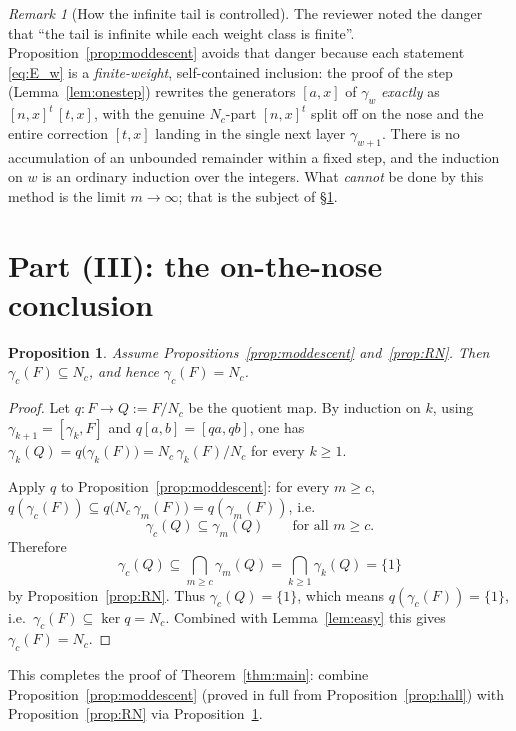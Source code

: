 \documentclass{amsart}
\newtheorem{proposition}{Proposition}
\theoremstyle{definition}
\theoremstyle{remark}
\newtheorem{remark}{Remark}
\begin{document}
\begin{remark}[How the infinite tail is controlled]\label{rem:tail}
The reviewer noted the danger that ``the tail is infinite while each weight class
is finite''. Proposition~\ref{prop:moddescent} avoids that danger because each
statement \eqref{eq:E_w} is a \emph{finite-weight}, self-contained inclusion: the
proof of the step (Lemma~\ref{lem:onestep}) rewrites the generators $[a,x]$ of
$\gamma_w$ \emph{exactly} as $[n,x]^t\,[t,x]$, with the genuine $N_c$-part $[n,x]^t$
split off on the nose and the entire correction $[t,x]$ landing in the single next
layer $\gamma_{w+1}$. There is no accumulation of an unbounded remainder within a
fixed step, and the induction on $w$ is an ordinary induction over the integers.
What \emph{cannot} be done by this method is the limit $m\to\infty$; that is the
subject of \S\ref{sec:final}.
\end{remark}

\section{Part (III): the on-the-nose conclusion}\label{sec:final}

\begin{proposition}\label{prop:final}
Assume Propositions~\ref{prop:moddescent} and~\ref{prop:RN}. Then
$\gamma_c(F)\subseteq N_c$, and hence $\gamma_c(F)=N_c$.
\end{proposition}

\begin{proof}
Let $q\colon F\to Q:=F/N_c$ be the quotient map. By induction on $k$, using
$\gamma_{k+1}=[\gamma_k,F]$ and $q[a,b]=[qa,qb]$, one has
$\gamma_k(Q)=q\big(\gamma_k(F)\big)=N_c\,\gamma_k(F)/N_c$ for every $k\ge1$.

Apply $q$ to Proposition~\ref{prop:moddescent}: for every $m\ge c$,
$q(\gamma_c(F))\subseteq q\big(N_c\,\gamma_m(F)\big)=q(\gamma_m(F))$, i.e.
\[
\gamma_c(Q)\subseteq\gamma_m(Q)\qquad\text{for all }m\ge c .
\]
Therefore
\[
\gamma_c(Q)\subseteq\bigcap_{m\ge c}\gamma_m(Q)
=\bigcap_{k\ge1}\gamma_k(Q)=\{1\}
\]
by Proposition~\ref{prop:RN}. Thus $\gamma_c(Q)=\{1\}$, which means
$q(\gamma_c(F))=\{1\}$, i.e.\ $\gamma_c(F)\subseteq\ker q=N_c$. Combined with
Lemma~\ref{lem:easy} this gives $\gamma_c(F)=N_c$.
\end{proof}

This completes the proof of Theorem~\ref{thm:main}: combine
Proposition~\ref{prop:moddescent} (proved in full from
Proposition~\ref{prop:hall}) with Proposition~\ref{prop:RN} via
Proposition~\ref{prop:final}.
\end{document}
